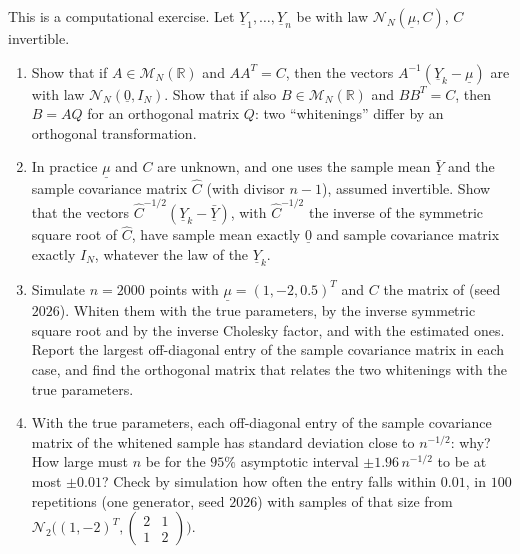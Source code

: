 \begin{exercise}\label{ex:gv-whitening}
\medium This is a computational exercise. Let $\underline Y_1,\dots,\underline Y_n$ be \iid with law
$\mathcal N_N(\underline\mu,C)$, $C$ invertible.
\begin{enumerate}[label=(\alph*)]
  \item Show that if $A\in\mathcal M_N(\mathbb R)$ and $AA^T=C$, then the vectors
    $A^{-1}(\underline Y_k-\underline\mu)$ are \iid with law $\mathcal N_N(\underline 0,I_N)$. Show
    that if also $B\in\mathcal M_N(\mathbb R)$ and $BB^T=C$, then $B=AQ$ for an orthogonal matrix $Q$: two ``whitenings'' differ by an
    orthogonal transformation.
  \item In practice $\underline\mu$ and $C$ are unknown, and one uses the sample mean
    $\bar{\underline Y}$ and the sample covariance matrix $\hat C$ (with divisor $n-1$), assumed
    invertible. Show that the vectors $\hat C^{-1/2}(\underline Y_k-\bar{\underline Y})$, with
    $\hat C^{-1/2}$ the inverse of the symmetric square root of $\hat C$, have sample mean exactly
    $\underline 0$ and sample covariance matrix exactly $I_N$, whatever the law of the
    $\underline Y_k$.
  \item Simulate $n=2000$ points with $\underline\mu=(1,-2,0.5)^T$ and $C$ the matrix of
     (seed $2026$). Whiten them with the true parameters, by the inverse
    symmetric square root and by the inverse Cholesky factor, and with the estimated ones. Report the
    largest off-diagonal entry of the sample covariance matrix in each case, and find the orthogonal
    matrix that relates the two whitenings with the true parameters.
  \item With the true parameters, each off-diagonal entry of the sample covariance matrix of the
    whitened sample has standard deviation close to $n^{-1/2}$: why? How large must $n$ be for the
    $95\%$ asymptotic interval $\pm1.96\,n^{-1/2}$ to be at most $\pm0.01$? Check by simulation how
    often the entry falls within $0.01$, in $100$ repetitions (one generator, seed $2026$) with
    samples of that size from $\mathcal N_2\big((1,-2)^T,\left(\begin{smallmatrix}2&1\\1&2\end{smallmatrix}\right)\big)$.
\end{enumerate}
\end{exercise}
